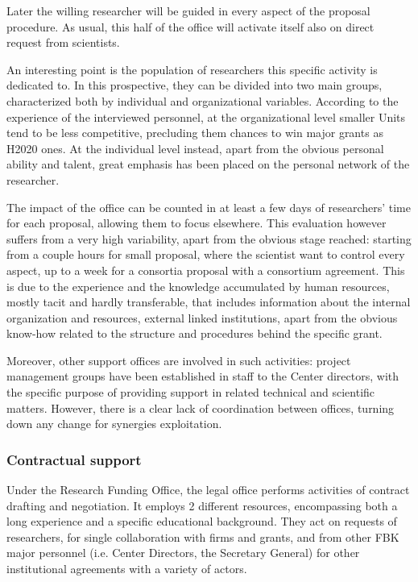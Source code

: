 Later the willing researcher will be guided in every aspect of the proposal procedure. As usual, this half of the office will activate itself also on direct request from scientists. 

An interesting point is the population of researchers this specific activity is dedicated to. In this prospective, they can be divided into two main groups, characterized both by individual and organizational variables. According to the experience of the interviewed personnel, at the organizational level smaller Units tend to be less competitive, precluding them chances to win major grants as H2020 ones. At the individual level instead, apart from the obvious personal ability and talent, great emphasis has been placed on the personal network of the researcher. 

The impact of the office can be counted in at least a few days of researchers’ time for each proposal, allowing them to focus elsewhere. This evaluation however suffers from a very high variability, apart from the obvious stage reached: starting from a couple hours for small proposal, where the scientist want to control every aspect, up to a week for a consortia proposal with a consortium agreement. This is due to the experience and the knowledge accumulated by human resources, mostly tacit and hardly transferable, that includes information about the internal organization and resources, external linked institutions, apart from the obvious know-how related to the structure and procedures behind the specific grant. 

Moreover, other support offices are involved in such activities: project management groups have been established in staff to the Center directors, with the specific purpose of providing support in related technical and scientific matters. However, there is a clear lack of coordination between offices, turning down any change for synergies exploitation.

\subsubsection{Contractual support}

Under the Research Funding Office, the legal office performs activities of contract drafting and negotiation. It employs 2 different resources, encompassing both a long experience and a specific educational background. They act on requests of researchers, for single collaboration with firms and grants, and from other FBK major personnel (i.e. Center Directors, the Secretary General) for other institutional agreements with a variety of actors.

